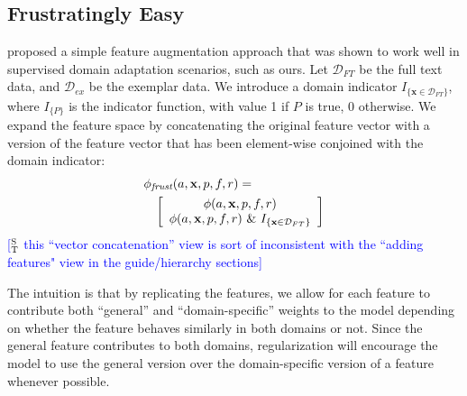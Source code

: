 \documentclass[11pt,a4paper]{article}
\newcommand{\indicator}[1]{I_{\{#1\}}} %
\newcommand{\ensuretext}[1]{#1}
\newcommand{\stmarker}{\ensuretext{\textcolor{blue}{\ensuremath{^{\textsc{S}}_{\textsc{T}}}}}}
\newcommand{\arkcomment}[3]{\ensuretext{\textcolor{#3}{[#1 #2]}}}
\newcommand{\st}[1]{\arkcomment{\stmarker}{#1}{blue}}
\begin{document}
\subsection{Frustratingly Easy}
\label{sec:frust}
\cite{daume-2009} proposed a simple feature augmentation approach that was shown to work well in supervised domain adaptation scenarios, 
such as ours.
Let $\mathcal{D}_{FT}$ be the full text data, and $\mathcal{D}_{ex}$ be the exemplar data.
We %
introduce a domain indicator %
$\indicator{\mathbf{x} \in \mathcal{D}_{FT}}$,
where $\indicator{P}$ is the indicator function, with value 1 if $P$ is true, 0 otherwise.
We expand the feature space by concatenating the original feature vector with a version of the feature vector that has been element-wise conjoined with the domain indicator:
\begin{align*}
\lefteqn{
\phi_{\textit{frust}}(a, \mathbf{x}, p, f, r) =
} \\
&&
\left[\begin{array}{c}
\phi(a, \mathbf{x}, p, f, r) \\
\phi(a, \mathbf{x}, p, f, r) \text{ \& } \indicator{\mathbf{x} \in \mathcal{D}_{FT}}%
\end{array}
\right]
\end{align*}
\st{this ``vector concatenation'' view is sort of inconsistent with the ``adding features" view in the guide/hierarchy sections}

The intuition is that by replicating the features, we allow for
each feature to contribute both ``general'' and ``domain-specific'' weights to the model depending on whether the feature
behaves similarly in both domains or not.
Since the general feature contributes to both domains, regularization will encourage the model to use the general version over the domain-specific version of a feature whenever possible.
\end{document}
